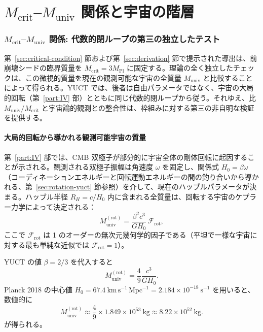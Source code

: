\documentclass[11pt,a4paper]{article}
\begin{document}
	\part{\(M_{\mathrm{crit}}\)–\(M_{\mathrm{univ}}\) 関係と宇宙の階層}
	\label{part:II}
	
	\section{\(M_{\mathrm{crit}}\)–\(M_{\mathrm{univ}}\) 関係: 代数的閉ループの第三の独立したテスト}
	\label{sec:third-test}
	
	第~\ref{sec:critical-condition} 節および第~\ref{sec:derivation} 節で提示された導出は、前崩壊シードの臨界質量を \(M_{\mathrm{crit}} = 3 M_{\mathrm{Pl}}\) に固定する。理論の全く独立したチェックは、この微視的質量を現在の観測可能な宇宙の全質量 \(M_{\mathrm{univ}}\) と比較することによって得られる。YUCT では、後者は自由パラメータではなく、宇宙の大局的回転（第~\ref{part:IV} 部）とともに同じ代数的閉ループから従う。それゆえ、比 \(M_{\mathrm{univ}} / M_{\mathrm{crit}}\) と宇宙論的観測との整合性は、枠組みに対する第三の非自明な検証を提供する。
	
	\subsection{大局的回転から導かれる観測可能宇宙の質量}
	
	第~\ref{part:IV} 部では、CMB 双極子が部分的に宇宙全体の剛体回転に起因することが示される。観測される双極子振幅は角速度 \(\omega\) を固定し、関係式 \(H_0 = \beta \omega\)（コーディネーションエネルギーと回転運動エネルギーの間の釣り合いから導かれる、第~\ref{sec:rotation-yuct} 節参照）を介して、現在のハッブルパラメータが決まる。ハッブル半径 \(R_H = c / H_0\) 内に含まれる全質量は、回転する宇宙のケプラー力学によって決定される：
	\begin{equation}
		M_{\mathrm{univ}}^{\mathrm{(rot)}} = \frac{\beta^2 c^3}{G H_0} \, \mathcal{F}_{\mathrm{rot}},
		\label{eq:muniv-rot}
	\end{equation}
	ここで \(\mathcal{F}_{\mathrm{rot}}\) は 1 のオーダーの無次元幾何学的因子である（平坦で一様な宇宙に対する最も単純な近似では \(\mathcal{F}_{\mathrm{rot}} = 1\)）。
	
	YUCT の値 \(\beta = 2/3\) を代入すると
	\begin{equation}
		M_{\mathrm{univ}}^{\mathrm{(rot)}} = \frac{4}{9} \frac{c^3}{G H_0}.
		\label{eq:muniv-rot-beta}
	\end{equation}
	Planck 2018 の中心値 \(H_0 = 67.4\ \mathrm{km\,s^{-1}\,Mpc^{-1}} = 2.184\times 10^{-18}\ \mathrm{s^{-1}}\) を用いると、数値的に
	\[
	M_{\mathrm{univ}}^{\mathrm{(rot)}} \approx \frac{4}{9} \times 1.849\times 10^{53}\ \mathrm{kg} \approx 8.22\times 10^{52}\ \mathrm{kg}.
	\]
	が得られる。
	
\end{document}
